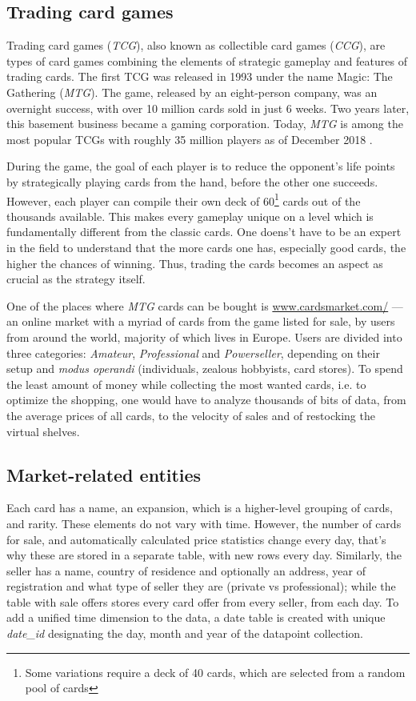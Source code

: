 \subsection{Trading card games}
Trading card games (\textit{TCG}), also known as collectible card games (\textit{CCG}), are types of card games combining the elements of strategic gameplay and features of trading cards.
The first TCG was released in 1993 under the name Magic: The Gathering (\textit{MTG}). The game, released by an eight-person company, was an overnight success, with over 10 million cards sold in just 6 weeks.
Two years later, this basement business became a gaming corporation. Today, \textit{MTG} is among the most popular TCGs with roughly 35 million players as of December 2018 \cite{magicTheGathering}. \par
During the game, the goal of each player is to reduce the opponent's life points by strategically playing cards from the hand, before the other one succeeds. However, each player can compile their own deck of 60\footnote{Some variations require a deck of 40 cards, which are selected from a random pool of cards} cards out of the thousands available. This makes every gameplay unique on a level which is fundamentally different from the classic cards. One doens't have to be an expert in the field to understand that the more cards one has, especially good cards, the higher the chances of winning. Thus, trading the cards becomes an aspect as crucial as the strategy itself. \par
One of the places where \textit{MTG} cards can be bought is \url{www.cardsmarket.com/} --- an online market with a myriad of cards from the game listed for sale, by users from around the world, majority of which lives in Europe. Users are divided into three categories: \textit{Amateur}, \textit{Professional} and \textit{Powerseller}, depending on their setup and \textit{modus operandi} (individuals, zealous hobbyists, card stores). To spend the least amount of money while collecting the most wanted cards, i.e. to optimize the shopping, one would have to analyze thousands of bits of data, from the average prices of all cards, to the velocity of sales and of restocking the virtual shelves.

\subsection{Market-related entities}
\label{entities}
Each card has a name, an expansion, which is a higher-level grouping of cards, and rarity. These elements do not vary with time. However, the number of cards for sale, and automatically calculated price statistics change every day, that's why these are stored in a separate table, with new rows every day. Similarly, the seller has a name, country of residence and optionally an address, year of registration and what type of seller they are (private vs professional); while the table with sale offers stores every card offer from every seller, from each day. To add a unified time dimension to the data, a date table is created with unique \textit{date\_id} designating the day, month and year of the datapoint collection.

